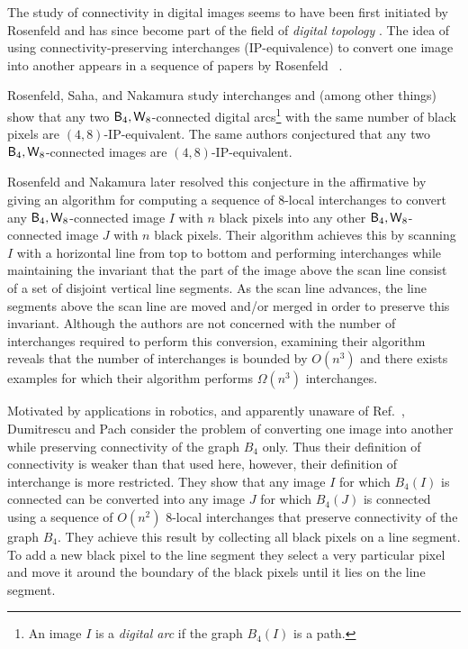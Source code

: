 \documentclass[lotsofwhite,charterfonts]{patmorin}
\newcommand{\foureight}{\ensuremath{\protect\textup{\textsf{B}}_{4},\protect\textup{\textsf{W}}_{8}}}
\begin{document}
The study of connectivity in digital images seems to have been first
initiated by Rosenfeld \cite{r70,r73,r74} and has since become part of
the field of \emph{digital topology} \cite{hr96,kr89}.  The idea of
using connectivity-preserving interchanges (IP-equivalence) to convert
one image into another appears in a sequence of papers by Rosenfeld
\etal\ \cite{rkn98,rn02,rsn01}.

Rosenfeld, Saha, and Nakamura \cite{rsn01} study interchanges and
(among other things) show that any two \foureight-connected digital
arcs\footnote{An image $I$ is a \emph{digital arc} if the graph
$B_4(I)$ is a path.} with the same number of black pixels are
$(4,8)$-IP-equivalent. The same authors conjectured that any two
\foureight-connected images are $(4,8)$-IP-equivalent.

Rosenfeld and Nakamura \cite{rn02} later resolved this conjecture in
the affirmative by giving an algorithm for computing a sequence of
$8$-local interchanges to convert any \foureight-connected image $I$ with $n$
black pixels into any other \foureight-connected image $J$ with $n$
black pixels. Their algorithm achieves this by scanning $I$ with a
horizontal line from top to bottom and performing interchanges while
maintaining the invariant that the part of the image above the scan line
consist of a set of disjoint vertical line segments. As the scan line
advances, the line segments above the scan line are moved and/or
merged in order to preserve this invariant.   Although the authors are
not concerned with the number of interchanges required to perform this
conversion, examining their algorithm reveals that the number of
interchanges is bounded by $O(n^3)$ and there exists examples for
which their algorithm performs $\Omega(n^3)$ interchanges.

Motivated by applications in robotics, and apparently unaware of
Ref.~\cite{rn02}, Dumitrescu and Pach \cite{dp04} consider the problem
of converting one image into another while preserving connectivity of
the graph $B_4$ only.  Thus their definition of connectivity is weaker than that used here, however, their definition of interchange is more restricted. They show that any image $I$ for
which $B_4(I)$ is connected can be converted into any image $J$ for
which $B_4(J)$ is connected using a sequence of $O(n^2)$ 8-local
interchanges that preserve connectivity of the graph
$B_4$. They achieve this result by collecting all black
pixels on a line segment.  To add a new black pixel to the line
segment they select a very particular pixel and move it around the
boundary of the black pixels until it lies on the line segment.
\end{document}
